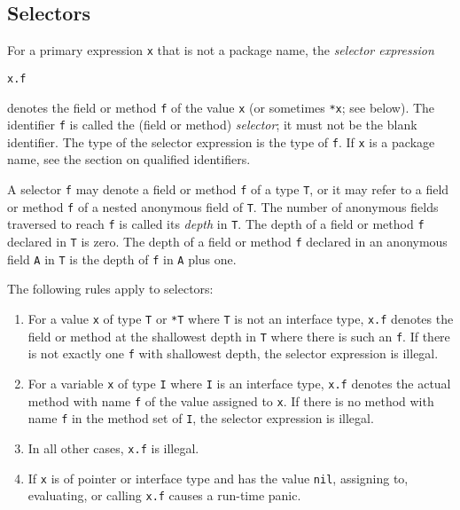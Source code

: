 \subsection*{Selectors}

For a primary expression \texttt{x}
that is not a package name, the
\emph{selector expression}

\begin{Verbatim}[frame=single]
x.f
\end{Verbatim}

denotes the field or method \texttt{f} of the value \texttt{x} (or
sometimes \texttt{*x}; see below). The identifier \texttt{f} is called
the (field or method) \emph{selector}; it must not be the
blank identifier. The type of the selector
expression is the type of \texttt{f}. If \texttt{x} is a package name,
see the section on qualified identifiers.

A selector \texttt{f} may denote a field or method \texttt{f} of a type
\texttt{T}, or it may refer to a field or method \texttt{f} of a nested
anonymous field of \texttt{T}. The number of
anonymous fields traversed to reach \texttt{f} is called its
\emph{depth} in \texttt{T}. The depth of a field or method \texttt{f}
declared in \texttt{T} is zero. The depth of a field or method
\texttt{f} declared in an anonymous field \texttt{A} in \texttt{T} is
the depth of \texttt{f} in \texttt{A} plus one.

The following rules apply to selectors:

\begin{enumerate}
\item
  For a value \texttt{x} of type \texttt{T} or \texttt{*T} where
  \texttt{T} is not an interface type, \texttt{x.f} denotes the field or
  method at the shallowest depth in \texttt{T} where there is such an
  \texttt{f}. If there is not exactly
  one \texttt{f} with shallowest
  depth, the selector expression is illegal.
\item
  For a variable \texttt{x} of type \texttt{I} where \texttt{I} is an
  interface type, \texttt{x.f} denotes the actual method with name
  \texttt{f} of the value assigned to \texttt{x}. If there is no method
  with name \texttt{f} in the method set of
  \texttt{I}, the selector expression is illegal.
\item
  In all other cases, \texttt{x.f} is illegal.
\item
  If \texttt{x} is of pointer or interface type and has the value
  \texttt{nil}, assigning to, evaluating, or calling \texttt{x.f} causes
  a run-time panic.
\end{enumerate}

